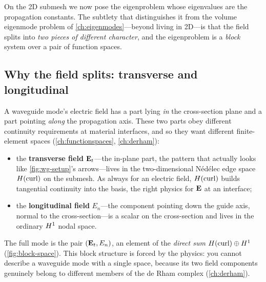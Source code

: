 On the 2D submesh we now pose the eigenproblem whose eigenvalues are the
propagation constants. The subtlety that distinguishes it from the volume
eigenmode problem of \cref{ch:eigenmodes}---beyond living in 2D---is that the field
splits into \emph{two pieces of different character}, and the eigenproblem is a
\emph{block} system over a pair of function spaces.

\subsection{Why the field splits: transverse and longitudinal}

A waveguide mode's electric field has a part lying \emph{in} the cross-section
plane and a part pointing \emph{along} the propagation axis. These two parts obey
different continuity requirements at material interfaces, and so they want
different finite-element spaces (\cref{ch:functionspaces}, \cref{ch:derham}):
\begin{itemize}[nosep]
  \item the \textbf{transverse field} $\mathbf{E}_t$---the in-plane part, the pattern
  that actually looks like \cref{fig:wg-setup}'s arrows---lives in the
  two-dimensional Nédélec edge space $H(\mathrm{curl})$ on the submesh. As always for an
  electric field, $H(\mathrm{curl})$ builds tangential continuity into the basis, the right
  physics for $\mathbf{E}$ at an interface;
  \item the \textbf{longitudinal field} $E_n$---the component pointing down the
  guide axis, normal to the cross-section---is a scalar on the cross-section and
  lives in the ordinary $H^1$ nodal space.
\end{itemize}
The full mode is the pair $(\mathbf{E}_t, E_n)$, an element of the \emph{direct sum}
$H(\mathrm{curl}) \oplus H^1$ (\cref{fig:block-space}). This block structure is forced by
the physics: you cannot describe a waveguide mode with a single space, because its
two field components genuinely belong to different members of the de Rham complex
(\cref{ch:derham}).


